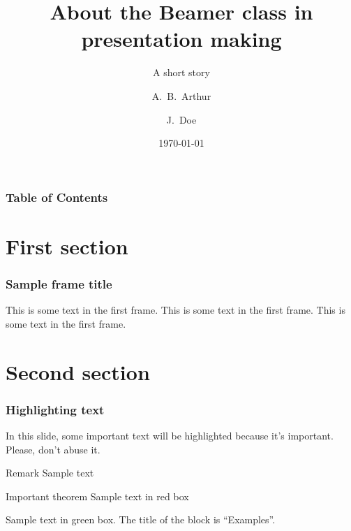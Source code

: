 \documentclass{beamer}
\title[About Beamer]
{About the Beamer class in presentation making}
\subtitle{A short story}
\author[Arthur, Doe] %
{A.~B.~Arthur\inst{1} \and J.~Doe\inst{2}}
\institute[NJU] %
{
\inst{1}%
Faculty of Physics\\
Very Famous University
\and
\inst{2}%
Faculty of Chemistry\\
Very Famous University
}
\date[ICLR 2023] %
{\today}
\begin{document}
\frame{\titlepage}

\begin{frame}
\frametitle{Table of Contents}
\tableofcontents
\end{frame}

\section{First section}

\begin{frame}
\frametitle{Sample frame title}
This is some text in the first frame. This is some text in the first frame. This is some text in the first frame.
\end{frame}

\section{Second section}

\begin{frame}
\frametitle{Highlighting text}

In this slide, some important text will be
\alert{highlighted} because it's important.
Please, don't abuse it.

\begin{block}{Remark}
Sample text
\end{block}

\begin{alertblock}{Important theorem}
Sample text in red box
\end{alertblock}

\begin{examples}
Sample text in green box. The title of the block is ``Examples''.
\end{examples}
\end{frame}
\end{document}
